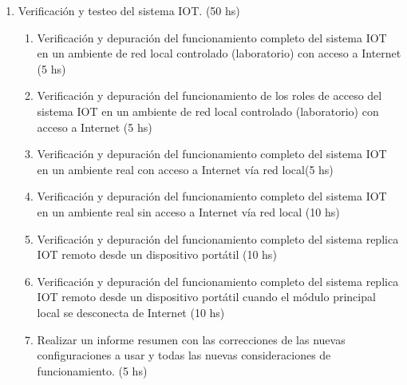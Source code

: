 \documentclass[11pt]{charter}
\begin{document}
\begin{enumerate}
\begin{enumerate}
	\end{enumerate}
\item Verificación y testeo del sistema IOT. (50 hs)
	\begin{enumerate}
	\item Verificación y depuración del funcionamiento completo del sistema IOT en un ambiente de red local controlado (laboratorio) con acceso a Internet (5 hs)
	\item Verificación y depuración del funcionamiento de los roles de acceso del sistema IOT en un ambiente de red local controlado (laboratorio) con acceso a Internet (5 hs) 
	\item Verificación y depuración del funcionamiento completo del sistema IOT en un ambiente real con acceso a Internet vía red local(5 hs) 
	\item Verificación y depuración del funcionamiento completo del sistema IOT en un ambiente real sin acceso a Internet vía red local (10 hs) 
	\item Verificación y depuración del funcionamiento completo del sistema replica IOT remoto desde un dispositivo portátil (10 hs)
	\item Verificación y depuración del funcionamiento completo del sistema replica IOT remoto desde un dispositivo portátil cuando el módulo principal local se desconecta de Internet (10 hs)
	\item Realizar un informe resumen con las correcciones de las nuevas configuraciones a usar y todas las nuevas consideraciones de funcionamiento. (5 hs)
	\end{enumerate}
		
\end{enumerate}
\end{document}
